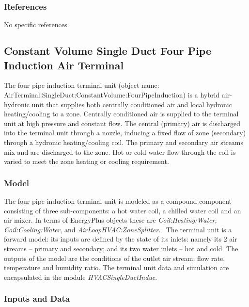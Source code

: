 \subsubsection{References}\label{references-001}

No specific references.

\subsection{Constant Volume Single Duct Four Pipe Induction Air Terminal}\label{constant-volume-single-duct-four-pipe-induction-air-terminal}

The four pipe induction terminal unit (object name: \\ AirTerminal:SingleDuct:ConstantVolume:FourPipeInduction) is a hybrid air-hydronic unit that supplies both centrally conditioned air and local hydronic heating/cooling to a zone. Centrally conditioned air is supplied to the terminal unit at high pressure and constant flow. The central (primary) air is discharged into the terminal unit through a nozzle, inducing a fixed flow of zone (secondary) through a hydronic heating/cooling coil. The primary and secondary air streams mix and are discharged to the zone. Hot or cold water flow through the coil is varied to meet the zone heating or cooling requirement.

\subsubsection{Model}\label{model}

The four pipe induction terminal unit is modeled as a compound component consisting of three sub-components: a hot water coil, a chilled water coil and an air mixer. In terms of EnergyPlus objects these are \emph{Coil:Heating:Water}, \emph{Coil:Cooling:Water}, and \emph{AirLoopHVAC:ZoneSplitter}.~ The terminal unit is a forward model: its inputs are defined by the state of its inlets: namely its 2 air streams -- primary and secondary; and its two water inlets -- hot and cold. The outputs of the model are the conditions of the outlet air stream: flow rate, temperature and humidity ratio. The terminal unit data and simulation are encapsulated in the module \emph{HVACSingleDuctInduc}.

\subsubsection{Inputs and Data}\label{inputs-and-data}

